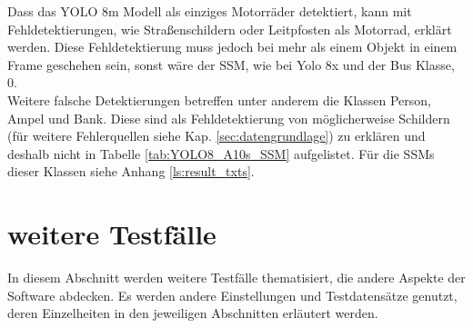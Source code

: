 {\begin{table}[ht]
\begin{tabular}{l|l|l|l|l|l|l}
			\end{tabular}
		\end{table}
		Dass das YOLO 8m Modell als einziges Motorräder detektiert, kann mit Fehldetektierungen, wie Straßenschildern oder Leitpfosten als Motorrad, erklärt werden. Diese Fehldetektierung muss jedoch bei mehr als einem Objekt in einem Frame geschehen sein, sonst wäre der SSM, wie bei Yolo 8x und der Bus Klasse, 0. \\
		Weitere falsche Detektierungen betreffen unter anderem die Klassen Person, Ampel und Bank. Diese sind als Fehldetektierung von möglicherweise Schildern (für weitere Fehlerquellen siehe Kap. \ref{sec:datengrundlage}) zu erklären und deshalb nicht in Tabelle \ref{tab:YOLO8_A10s_SSM} aufgelistet. Für die SSMs dieser Klassen siehe Anhang \ref{ls:result_txts}.
	}

\section{weitere Testfälle}
{
	In diesem Abschnitt werden weitere Testfälle thematisiert, die andere Aspekte der Software abdecken. Es werden andere Einstellungen und Testdatensätze genutzt, deren Einzelheiten in den jeweiligen Abschnitten erläutert werden.

}
